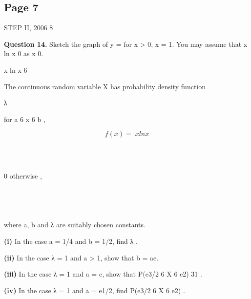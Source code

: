 \documentclass[12pt]{article}
\begin{document}
\subsection*{Page 7}
\begin{flushleft}
STEP II, 2006 8\par
\bigskip\textbf{Question 14.} Sketch the graph of y = for x > 0, x = 1. You may assume that x ln x 0 as x 0.\par
x ln x 6 \to \to\par
The continuous random variable X has probability density function\par
λ\par
for a 6 x 6 b ,\par
\[f(x) =  x ln x\]
\par
\par
0 otherwise ,\par
\par
\par
where a, b and λ are suitably chosen constants.\par
\textbf{(i)} In the case a = 1/4 and b = 1/2, find λ .\par
\textbf{(ii)} In the case λ = 1 and a > 1, show that b = ae.\par
\textbf{(iii)} In the case λ = 1 and a = e, show that P(e3/2 6 X 6 e2) 31 .\par
{}\par
\textbf{(iv)} In the case λ = 1 and a = e1/2, find P(e3/2 6 X 6 e2) .\par
\end{flushleft}
\end{document}
